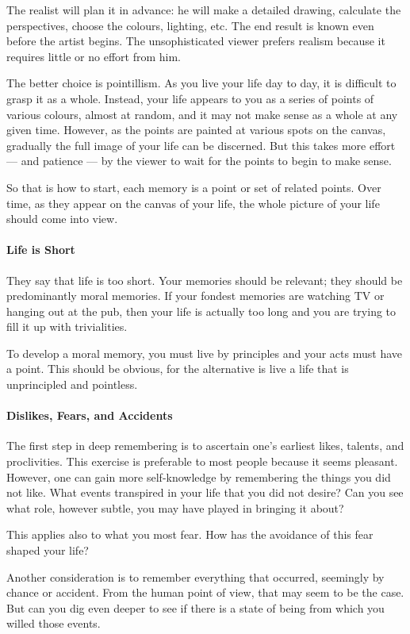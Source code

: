 The realist will plan it in advance: he will make a detailed drawing, calculate the perspectives, choose the colours, lighting, etc. The end result is known even before the artist begins. The unsophisticated viewer prefers realism because it requires little or no effort from him.

The better choice is pointillism. As you live your life day to day, it is difficult to grasp it as a whole. Instead, your life appears to you as a series of points of various colours, almost at random, and it may not make sense as a whole at any given time. However, as the points are painted at various spots on the canvas, gradually the full image of your life can be discerned. But this takes more effort — and patience — by the viewer to wait for the points to begin to make sense.

So that is how to start, each memory is a point or set of related points. Over time, as they appear on the canvas of your life, the whole picture of your life should come into view.

\paragraph{Life is Short}
They say that life is too short. Your memories should be relevant; they should be predominantly moral memories. If your fondest memories are watching TV or hanging out at the pub, then your life is actually too long and you are trying to fill it up with trivialities.

To develop a moral memory, you must live by principles and your acts must have a point. This should be obvious, for the alternative is live a life that is unprincipled and pointless.

\paragraph{Dislikes, Fears, and Accidents}
The first step in deep remembering is to ascertain one's earliest likes, talents, and proclivities. This exercise is preferable to most people because it seems pleasant. However, one can gain more self-knowledge by remembering the things you did not like. What events transpired in your life that you did not desire? Can you see what role, however subtle, you may have played in bringing it about?

This applies also to what you most fear. How has the avoidance of this fear shaped your life?

Another consideration is to remember everything that occurred, seemingly by chance or accident. From the human point of view, that may seem to be the case. But can you dig even deeper to see if there is a state of being from which you willed those events.

